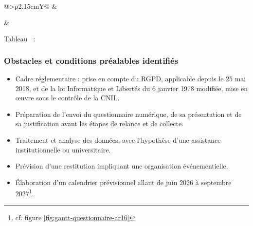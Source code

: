 \begin{xltabular}{\linewidth}{@{}>{\RaggedRight\arraybackslash}p{2.15cm}Y@{}}
 &
 \\
\addlinespace

 &
 \\

\end{xltabular}
\endgroup
\par\nopagebreak\vspace{0.4em}
\begin{center}
%
\label{tab:reunions_initiatives_comite}%
\label{tab:reunions_initiatives_comite_page_fin}%
%
Tableau~\thetable{} : \titreTableauReunionsInitiatives
\end{center}

\subsubsection*{Obstacles et conditions préalables identifiés}

\begin{itemize}[leftmargin=*]
    \item Cadre réglementaire : prise en compte du RGPD, applicable depuis le 25 mai 2018, et de la loi Informatique et Libertés du 6 janvier 1978 modifiée, mise en œuvre sous le contrôle de la CNIL.
    \item Préparation de l'envoi du questionnaire numérique, de sa présentation et de sa justification avant les étapes de relance et de collecte.
    \item Traitement et analyse des données, avec l'hypothèse d'une assistance institutionnelle ou universitaire.
    \item Prévision d'une restitution impliquant une organisation événementielle.
    \item Élaboration d'un calendrier prévisionnel allant de juin 2026 à septembre 2027\footnote{cf. figure \ref{fig:gantt-questionnaire-ar16}}.
\end{itemize}

